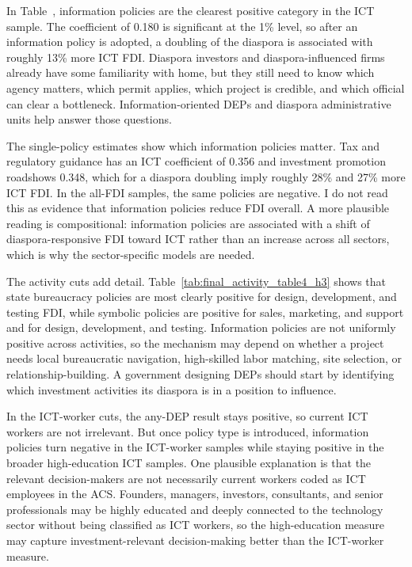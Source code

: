 \documentclass[12pt]{article}
\begin{document}
In Table~, information policies are the clearest positive category in the ICT sample. The coefficient of 0.180 is significant at the 1\% level, so after an information policy is adopted, a doubling of the diaspora is associated with roughly 13\% more ICT FDI. Diaspora investors and diaspora-influenced firms already have some familiarity with home, but they still need to know which agency matters, which permit applies, which project is credible, and which official can clear a bottleneck. Information-oriented DEPs and diaspora administrative units help answer those questions.

The single-policy estimates show which information policies matter. Tax and regulatory guidance has an ICT coefficient of 0.356 and investment promotion roadshows 0.348, which for a diaspora doubling imply roughly 28\% and 27\% more ICT FDI. In the all-FDI samples, the same policies are negative. I do not read this as evidence that information policies reduce FDI overall. A more plausible reading is compositional: information policies are associated with a shift of diaspora-responsive FDI toward ICT rather than an increase across all sectors, which is why the sector-specific models are needed.

The activity cuts add detail. Table~\ref{tab:final_activity_table4_h3} shows that state bureaucracy policies are most clearly positive for design, development, and testing FDI, while symbolic policies are positive for sales, marketing, and support and for design, development, and testing. Information policies are not uniformly positive across activities, so the mechanism may depend on whether a project needs local bureaucratic navigation, high-skilled labor matching, site selection, or relationship-building. A government designing DEPs should start by identifying which investment activities its diaspora is in a position to influence.

In the ICT-worker cuts, the any-DEP result stays positive, so current ICT workers are not irrelevant. But once policy type is introduced, information policies turn negative in the ICT-worker samples while staying positive in the broader high-education ICT samples. One plausible explanation is that the relevant decision-makers are not necessarily current workers coded as ICT employees in the ACS. Founders, managers, investors, consultants, and senior professionals may be highly educated and deeply connected to the technology sector without being classified as ICT workers, so the high-education measure may capture investment-relevant decision-making better than the ICT-worker measure.
\end{document}
